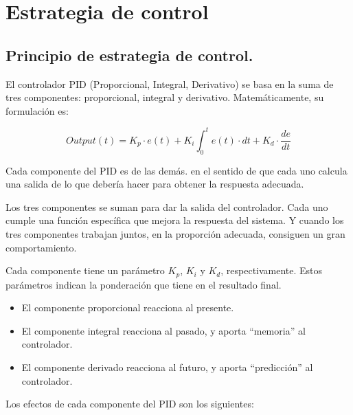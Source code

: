 \chapter{Estrategia de control}

\label{C:Formas de control}

\section{Principio de estrategia de control.}
El controlador PID (Proporcional, Integral, Derivativo) se basa en la suma de tres componentes: proporcional, integral y derivativo. Matemáticamente, su formulación es: \par
\begin{equation}
Output(t)=K_p\cdot e(t)+K_i\int_0^t e(t)\cdot dt+K_d\cdot \frac{de}{dt}
\end{equation} \par 
Cada componente del PID es  de las demás. en el sentido de que cada uno calcula una salida de lo que  debería hacer para obtener la respuesta adecuada. \par 
Los tres componentes se suman para dar la salida del controlador. Cada uno cumple una función específica que mejora la respuesta del sistema. Y cuando los tres componentes trabajan juntos, en la proporción adecuada, consiguen un gran comportamiento. \par 
Cada componente tiene un parámetro $K_p$, $K_i$ y $K_d$, respectivamente. Estos parámetros indican la ponderación que tiene en el resultado final.
\begin{itemize}
\item El componente proporcional reacciona al presente.
\item El componente integral reacciona al pasado, y aporta “memoria” al controlador.
\item El componente derivado reacciona al futuro, y aporta “predicción” al controlador.
\end{itemize} \par 
Los efectos de cada componente del PID son los siguientes:

